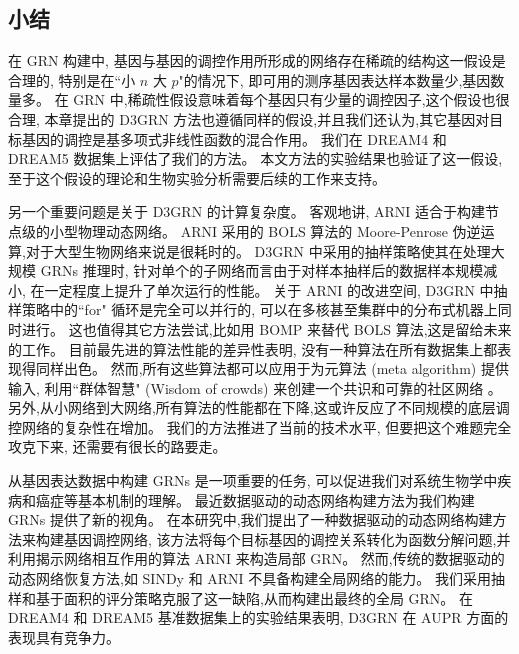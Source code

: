 \subsection{小结}

在 GRN 构建中, 基因与基因的调控作用所形成的网络存在稀疏的结构这一假设是合理的,
特别是在``小 $n$ 大 $p$"的情况下, 即可用的测序基因表达样本数量少,基因数量多。
在 GRN 中,稀疏性假设意味着每个基因只有少量的调控因子,这个假设也很合理,
本章提出的 D3GRN 方法也遵循同样的假设,并且我们还认为,其它基因对目标基因的调控是基多项式非线性函数的混合作用。
我们在 DREAM4 和 DREAM5 数据集上评估了我们的方法。
本文方法的实验结果也验证了这一假设,至于这个假设的理论和生物实验分析需要后续的工作来支持。

另一个重要问题是关于 D3GRN 的计算复杂度。
客观地讲, ARNI 适合于构建节点级的小型物理动态网络。
ARNI 采用的 BOLS 算法的 Moore-Penrose 伪逆运算,对于大型生物网络来说是很耗时的。
D3GRN 中采用的抽样策略使其在处理大规模 GRNs 推理时,
针对单个的子网络而言由于对样本抽样后的数据样本规模减小,
在一定程度上提升了单次运行的性能。
关于 ARNI 的改进空间, D3GRN 中抽样策略中的``for" 循环是完全可以并行的,
可以在多核甚至集群中的分布式机器上同时进行。
这也值得其它方法尝试,比如用 BOMP \cite{majumdar2009fast}来替代 BOLS 算法,这是留给未来的工作。
目前最先进的算法性能的差异性表明,
没有一种算法在所有数据集上都表现得同样出色。
然而,所有这些算法都可以应用于为元算法 (meta algorithm) 提供输入,
利用``群体智慧" (Wisdom of crowds) 来创建一个共识和可靠的社区网络 \cite{Marbach2012a,zheng2008gene}。
另外,从小网络到大网络,所有算法的性能都在下降,这或许反应了不同规模的底层调控网络的复杂性在增加。
我们的方法推进了当前的技术水平, 但要把这个难题完全攻克下来, 还需要有很长的路要走。

从基因表达数据中构建 GRNs 是一项重要的任务,
可以促进我们对系统生物学中疾病和癌症等基本机制的理解。
最近数据驱动的动态网络构建方法为我们构建 GRNs 提供了新的视角。
在本研究中,我们提出了一种数据驱动的动态网络构建方法来构建基因调控网络,
该方法将每个目标基因的调控关系转化为函数分解问题,并利用揭示网络相互作用的算法 ARNI 来构造局部 GRN。
然而,传统的数据驱动的动态网络恢复方法,如 SINDy 和 ARNI 不具备构建全局网络的能力。
我们采用抽样和基于面积的评分策略克服了这一缺陷,从而构建出最终的全局 GRN。
在 DREAM4 和 DREAM5 基准数据集上的实验结果表明, D3GRN 在 AUPR 方面的表现具有竞争力。